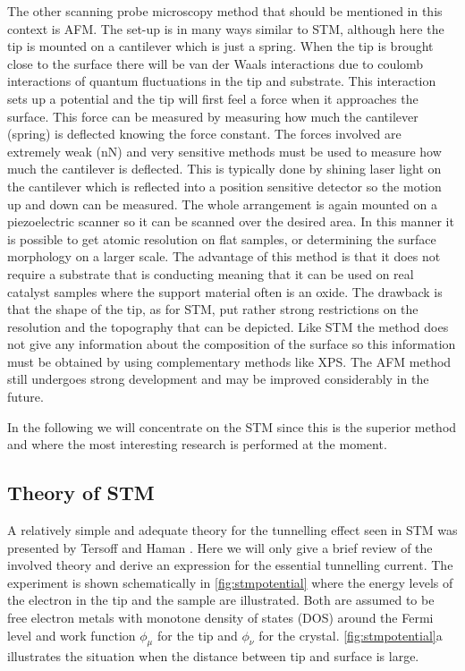 The other scanning probe microscopy method that should be mentioned in this context is AFM. The set-up is in many ways similar to STM, although here the tip is mounted on a cantilever which is just a spring. When the tip is brought close to the surface there will be van der Waals interactions due to coulomb interactions of quantum fluctuations in the tip and substrate. This interaction sets up a potential and the tip will first feel a force when it approaches the surface. This force can be measured by measuring how much the cantilever (spring) is deflected knowing the force constant. The forces involved are extremely weak (\si{nN}) and very sensitive methods must be used to measure how much the cantilever is deflected. This is typically done by shining laser light on the cantilever which is reflected into a position sensitive detector so the motion up and down can be measured. The whole arrangement is again mounted on a piezoelectric scanner so it can be scanned over the desired area. In this manner it is possible to get atomic resolution on flat samples, or determining the  surface morphology on a larger scale. The advantage of this method is that it does not require a substrate that is conducting meaning that it can be used on real catalyst samples where the support material often is an oxide. The drawback is  that the shape of the tip, as for STM, put rather strong restrictions on the resolution and the topography that can be depicted. Like STM the method does not give any information about the composition of the surface so this information must be obtained by using complementary methods like XPS. The AFM method still undergoes strong development and may be improved considerably in the future.

In the following we will concentrate on the STM since this is the superior method and where the most interesting research is performed at the moment.

\subsection{Theory of STM}
A relatively simple and adequate theory for the tunnelling effect seen in STM was presented by Tersoff and Haman \cite{Tersoff}. Here we will only give a brief review of the involved theory and derive an expression for the essential tunnelling current. The experiment is shown schematically in \autoref{fig:stmpotential} where the energy levels of the electron in the tip and the sample are illustrated. Both are assumed to be free electron metals with monotone density of states (DOS) around the Fermi level and work function $\phi_{\mu}$  for the tip and  $\phi_{\nu}$ for the crystal. \autoref{fig:stmpotential}a illustrates the situation when the distance  between tip and surface is large. 

